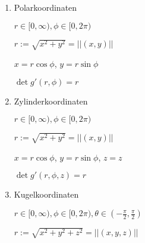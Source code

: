 \documentclass[]{article}
\begin{document}
				\begin{enumerate}[1.]
					\item Polarkoordinaten
						
						\begin{math} r \in [0, \infty), \phi \in [0, 2\pi) \end{math}
						
						\begin{math} r := \sqrt{x^2 + y^2} = ||(x,y)|| \end{math}
						
						\begin{math} x = r \cos \phi \end{math},
						\begin{math} y = r \sin \phi \end{math}
						
						\begin{math} \det g'(r, \phi) = r \end{math}
							
					\item Zylinderkoordinaten
						
						\begin{math} r \in [0, \infty), \phi \in [0, 2\pi) \end{math}
						
						\begin{math} r := \sqrt{x^2 + y^2} = ||(x,y)|| \end{math}
						
						\begin{math} x = r \cos \phi \end{math},
						\begin{math} y = r \sin \phi \end{math},
						\begin{math} z = z \end{math}
						
						\begin{math} \det g'(r, \phi, z) = r \end{math}
					
					\item Kugelkoordinaten
					
						\begin{math} r \in [0, \infty), \phi \in [0, 2\pi), \theta \in (- \frac{\pi}{2}, \frac{\pi}{2}) \end{math}
					
						\begin{math} r := \sqrt{x^2 + y^2 + z^2} = ||(x,y,z)|| \end{math}
					

\end{enumerate}
\end{document}
